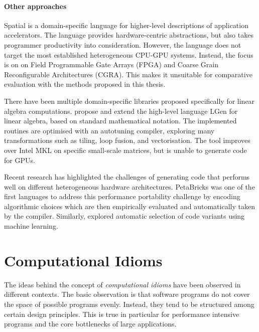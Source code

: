     \paragraph*{Other approaches}
    Spatial \citep{Koeplinger:2018:SLC:3192366.3192379} is a domain-specific
    language for higher-level descriptions of application accelerators.
    The language provides hardware-centric abstractions, but also takes
    programmer productivity into consideration.
    However, the language does not target the most established heterogeneous
    CPU-GPU systems.
    Instead, the focus is on on Field Programmable Gate Arrays (FPGA) and
    Coarse Grain Reconfigurable Architectures (CGRA).
    This makes it unsuitable for comparative evaluation with the methods
    proposed in this thesis.

    There have been multiple domain-specific libraries proposed specifically
    for linear algebra computations.
    \citet{Spampinato:2014:BLA:2581122.2544155,
    Spampinato:2016:BLA:2854038.2854060} propose and extend the high-level
    language LGen for linear algebra, based on standard mathematical notation.
    The implemented routines are optimised with an autotuning compiler,
    exploring many transformations such as tiling, loop fusion, and
    vectorisation.
    The tool improves over Intel MKL on specific small-scale matrices, but is
    unable to generate code for GPUs.

    Recent research has highlighted the challenges of generating code that
    performs well on different heterogeneous hardware architectures.
    PetaBricks \citep{Ansel:2009:PLC:1542476.1542481,PhothilimthanaARA13} was
    one of the first languages to address this performance portability challenge
    by encoding algorithmic choices which are then empirically evaluated and
    automatically taken by the
    compiler.
    Similarly, \citet{MuralidharanRHG16} explored automatic selection of code
    variants using machine learning.

\section{Computational Idioms}

    The ideas behind the concept of {\it computational idioms} have been
    observed in different contexts.
    The basic observation is that software programs do not cover the
    space of possible programs evenly.
    Instead, they tend to be structured among certain design principles.
    This is true in particular for performance intensive programs and the
    core bottlenecks of large applications.

